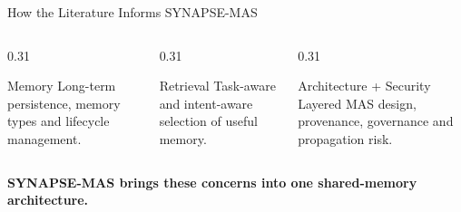 \begin{frame}{How the Literature Informs SYNAPSE-MAS}
\begin{columns}[T,onlytextwidth]
\begin{column}{0.31\textwidth}
\begin{block}{Memory}
Long-term persistence, memory types and lifecycle management.
\end{block}
\end{column}
\begin{column}{0.31\textwidth}
\begin{block}{Retrieval}
Task-aware and intent-aware selection of useful memory.
\end{block}
\end{column}
\begin{column}{0.31\textwidth}
\begin{block}{Architecture + Security}
Layered MAS design, provenance, governance and propagation risk.
\end{block}
\end{column}
\end{columns}
\vspace{5mm}
\centering\large\textbf{SYNAPSE-MAS brings these concerns into one shared-memory architecture.}
\end{frame}
